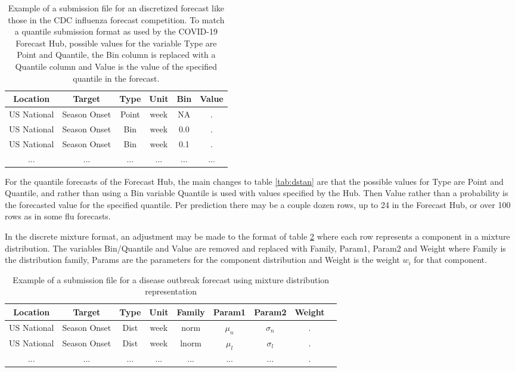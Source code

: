 \documentclass[11pt,notitlepage]{isuthesis}
\begin{document}
\begin{table}[h!]
\label{tab:dstan}
\centering
 \begin{tabular}{|c|c|c|c|c|c|}
 \hline
    Location & Target & Type & Unit & Bin & Value  \\ \hline
    US National & Season Onset & Point & week & NA & . \\
    US National & Season Onset & Bin & week & 0.0 & . \\
    US National & Season Onset & Bin & week & 0.1 & . \\
    ... & ... & ... & ... & ... & ... \\
 \hline
 \end{tabular}
 \caption[Influenza competition submission example]{Example of a submission file
 for an discretized forecast like those in the CDC influenza forecast 
 competition. To match a quantile submission format as used by
 the COVID-19 Forecast Hub, possible values for the variable Type are Point and
 Quantile, the Bin column is replaced with a Quantile column and Value is 
 the value of the specified quantile in the forecast.}
 \label{table:dstan}
\end{table}

For the quantile forecasts of the Forecast Hub, the main changes to table
\ref{tab:dstan} are that the possible values for Type 
are Point and Quantile, and rather than using a Bin variable Quantile is used
with values specified by the Hub. Then Value rather than a probability is the
forecasted value for the specified quantile. Per prediction there may be a 
couple dozen rows, up to 24 in the Forecast Hub, or over 100 rows as in some
flu forecasts. 

In the discrete mixture format, an adjustment may be made to the format of table 
\ref{table:dstan} where each 
row
represents a component in a mixture distribution.
The variables Bin/Quantile and Value are removed and replaced with Family,
Param1, Param2 and Weight where Family is the distribution family,
Params are the parameters for the component distribution and Weight is the 
weight $w_i$ for that component.

\begin{table}[h!]
\centering
 \begin{tabular}{|c|c|c|c|c|c|c|c|c|}
 \hline
    Location & Target & Type & Unit & Family & Param1 & Param2 & Weight
    \\ \hline
    US National & Season Onset & Dist & week & norm & $\mu_n$ & $\sigma_n$ & .\\
    US National & Season Onset & Dist & week & lnorm & $\mu_l$ & $\sigma_l$ &.\\
    ... & ... & ... & ... & ... & ... & ... & .\\
 \hline
 \end{tabular}
 \caption[Mixture distribution forecast submission example]{Example of a 
 submission file
 for a disease outbreak forecast using mixture distribution representation}
 \label{table:dstan}
\end{table}
\end{document}
